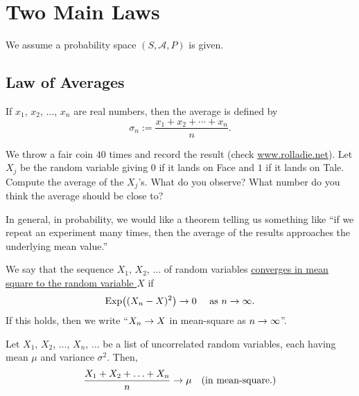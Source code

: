 \chapter{Two Main Laws}

We assume a probability space $(S, \mathcal{A}, P)$ is given.

\section{Law of Averages}

\begin{definition}
If $x_1$, $x_2$, $\ldots$, $x_n$ are real numbers, then the average is defined by
    \[
        \sigma_n := \frac{x_1 + x_2 + \cdots + x_n}{n} .
    \]
\end{definition}

\begin{example}
We throw a fair coin $40$ times and record the result (check \url{www.rolladie.net}). Let $X_j$ be the random variable giving $0$ if it lands on Face and $1$ if it lands on Tale. Compute the average of the $X_j$'s. What do you observe? What number do you think the average should be close to?
\end{example}

In general, in probability, we would like a theorem telling us something like ``if we repeat an experiment many times, then the average of the results approaches the underlying mean value.''

\begin{definition}
We say that the sequence $X_1$, $X_2$, $\ldots$ of random variables \underline{converges in mean} \underline{square to the random variable $X$} if
    \[
        \mathrm{Exp} \big( (X_n - X)^2 \big) \rightarrow 0 \quad \text{ as } n \rightarrow \infty.
    \]
If this holds, then we write ``$X_n \rightarrow X$ in mean-square as $n \rightarrow \infty$''.
\end{definition}

\begin{theorem}

Let $X_1$, $X_2$, $\ldots$, $X_n$, $\ldots$ be a list of uncorrelated random variables, each having mean $\mu$ and variance $\sigma^2$. Then,
    \[
        \frac{X_1 + X_2 + \ldots + X_n}{n} \rightarrow \mu \quad \text{(in mean-square.)}
    \]
\end{theorem}

